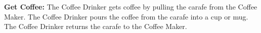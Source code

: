 \documentclass[letterpaper]{article}
\begin{document}
\noindent
\textbf{Get Coffee:  }The Coffee Drinker gets coffee by pulling the
carafe from the Coffee Maker.  The Coffee Drinker pours the coffee
from the carafe into a cup or mug.  The Coffee Drinker returns the
carafe to the Coffee Maker.
\end{document}
